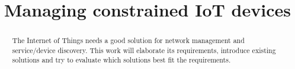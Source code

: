 \documentclass[conference]{IEEEtran}
\begin{document}
%
\title{Managing constrained IoT devices}


\author{
}


% 








\maketitle


\begin{abstract}
The Internet of Things needs a good solution for network management and service/device discovery. This work will elaborate its requirements, introduce existing solutions and try to evaluate which solutions best fit the requirements.
\end{abstract}
\end{document}
